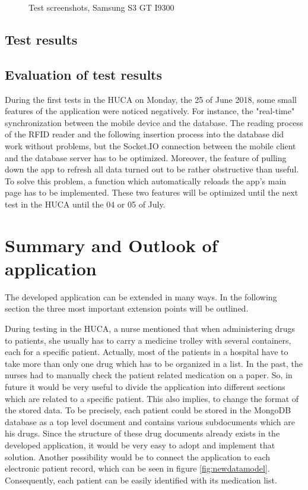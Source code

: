 \begin{figure}
\centering
\subfigure{\texttt{[image: s3\_01]}}
\subfigure{\texttt{[image: s3\_02]}}
\subfigure{\texttt{[image: s3\_03]}}
\subfigure{\texttt{[image: s3\_04]}}
\caption{\label{fig:s3_screenshots} Test screenshots, Samsung S3 GT I9300}
\end{figure}

\subsection{Test results}

\subsection{Evaluation of test results}

During the first tests in the HUCA on Monday, the 25 of June 2018, some small features of the application were noticed negatively. For instance, the "real-time" synchronization between the mobile device and the database. The reading process of the RFID reader and the following insertion process into the database did work without problems, but the Socket.IO connection between the mobile client and the database server has to be optimized. Moreover, the feature of pulling down the app to refresh all data turned out to be rather obstructive than useful. To solve this problem, a function which automatically reloads the app's main page has to be implemented. These two features will be optimized until the next test in the HUCA until the 04 or 05 of July.

\section{Summary and Outlook of application}

The developed application can be extended in many ways. In the following section the three most important extension points will be outlined.

During testing in the HUCA, a nurse mentioned that when administering drugs to patients, she usually has to carry a medicine trolley with several containers, each for a specific patient. Actually, most of the patients in a hospital have to take more than only one drug which has to be organized in a list. In the past, the nurses had to manually check the patient related medication on a paper.
So, in future it would be very useful to divide the application into different sections which are related to a specific patient. This also implies, to change the format of the stored data. To be precisely, each patient could be stored in the MongoDB database as a top level document and contains various subdocuments which are his drugs. Since the structure of these drug documents already exists in the developed application, it would be very easy to adopt and implement that solution. Another possibility would be to connect the application to each electronic patient record, which can be seen in figure \ref{fig:newdatamodel}. Consequently, each patient can be easily identified with its medication list.

